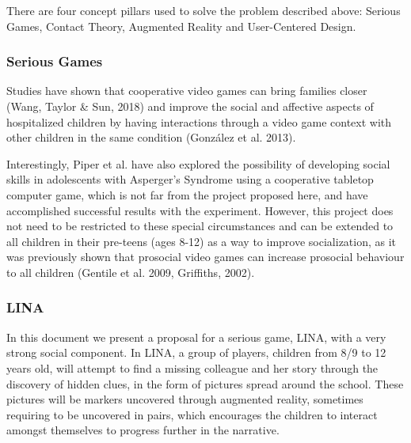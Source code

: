 \documentclass[runningheads]{llncs}
\begin{document}
  
\par There are four concept pillars used to solve the problem described above: Serious Games, Contact Theory, Augmented Reality and User-Centered Design.

\subsubsection{Serious Games}
\par Studies have shown that cooperative video games can bring families closer (Wang, Taylor \& Sun, 2018) and improve the social and affective aspects of hospitalized children by having interactions through a video game context with other children in the same condition (González et al. 2013).  
\par Interestingly, Piper et al. have also explored the possibility of developing social skills in adolescents with Asperger's Syndrome using a cooperative tabletop computer game, which is not far from the project proposed here, and have accomplished successful results with the experiment. However, this project does not need to be restricted to these special circumstances and can be extended to all children in their pre-teens (ages 8-12) as a way to improve socialization, as it was previously shown that prosocial video games can increase prosocial behaviour to all children (Gentile et al. 2009, Griffiths, 2002).


\subsubsection{LINA}
\par In this document we present a proposal for a serious game, LINA, with a very strong social component. In LINA, a group of players, children from 8/9 to 12 years old, will attempt to find a missing colleague and her story through the discovery of hidden clues, in the form of pictures spread around the school. These pictures will be markers uncovered through augmented reality, sometimes requiring to be uncovered in pairs, which encourages the children to interact amongst themselves to progress further in the narrative.
\end{document}
